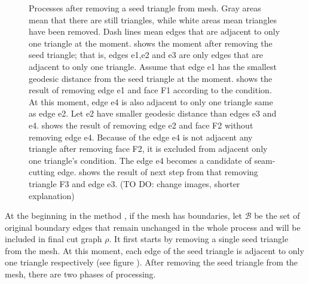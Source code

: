 \documentclass[a4paper,twoside]{article}
\begin{document}
\begin{figure}[t]
	\hspace{0.000\columnwidth}
	\caption{Processes after removing a seed triangle from mesh. Gray areas mean that there are still triangles, while white areas mean triangles have been removed. Dash lines mean edges that are adjacent to only one triangle at the moment.  shows the moment after removing the seed triangle; that is, edges e1,e2 and e3 are only edges that are adjacent to only one triangle. Assume that edge e1 has the smallest geodesic distance from the seed triangle at the moment.  shows the result of removing edge e1 and face F1 according to the condition. At this moment, edge e4 is also adjacent to only one triangle same as edge e2. Let e2 have smaller geodesic distance than edges e3 and e4.   shows the result of removing edge e2 and face F2 without removing edge e4. Because of the edge e4 is not adjacent any triangle after removing face F2, it is excluded from adjacent only one triangle's condition. The edge e4 becomes a candidate of seam-cutting edge.  shows the result of next step from  that removing triangle F3 and edge e3. (TO DO: change images, shorter explanation)}
	\label{fig:OriginalGenusReduceMethodStepByStep}
\end{figure}

At the beginning in the method , if the mesh has boundaries, let $\mathscr{B}$  be the set of original boundary edges that remain unchanged in the whole process and will be included in final cut graph ${\rho}$. It first starts by removing a single seed triangle from the mesh. At this moment, each edge of the seed triangle is adjacent to only one triangle respectively (see figure ).  After removing the seed triangle from the mesh, there are two phases of processing.
\end{document}
